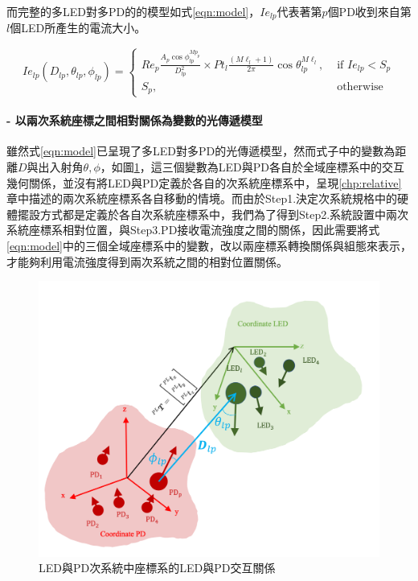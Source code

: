         而完整的多LED對多PD的的模型如式\ref{eqn:model}，$Ie_{lp}$代表著第$p$個PD收到來自第$l$個LED所產生的電流大小。
        
        \begin{equation}
            \label{eqn:model}
            Ie_{lp}(D_{lp},\theta_{lp},\phi_{lp}) = \begin{cases}Re_p \frac{ A_p\cos\phi_{lp}^{Mp_{p}} }{D^2_{lp}}\times Pt_l\frac{(M\ell_{l}+1)}{2 \pi} \cos \theta_{lp}^{M\ell_{l}}, & \text { if } Ie_{lp}<S_p \\ S_p, & \text { otherwise }\end{cases}
        \end{equation}
    
        
    
    
    
    
        \paragraph*{- 以兩次系統座標之間相對關係為變數的光傳遞模型}

        \hfill
    
        雖然式\ref{eqn:model}已呈現了多LED對多PD的光傳遞模型，然而式子中的變數為距離$D$與出入射角$\theta,\phi$，如圖\ref{pic:relative_vs_coor}，這三個變數為LED與PD各自於全域座標系中的交互幾何關係，並沒有將LED與PD定義於各自的次系統座標系中，呈現\ref{chp:relative}章中描述的兩次系統座標系各自移動的情境。而由於Step1.決定次系統規格中的硬體擺設方式都是定義於各自次系統座標系中，我們為了得到Step2.系統設置中兩次系統座標系相對位置，與Step3.PD接收電流強度之間的關係，因此需要將式\ref{eqn:model}中的三個全域座標系中的變數，改以兩座標系轉換關係與組態來表示，才能夠利用電流強度得到兩次系統之間的相對位置關係。
    
        \begin{figure}[htpb]
            \centering
            \includegraphics[width=15cm]{ch2pic/relative_vs_coor.png}
            \caption{LED與PD次系統中座標系的LED與PD交互關係}
            \label{pic:relative_vs_coor}
        \end{figure}
    
